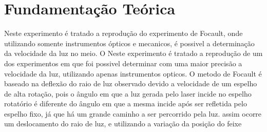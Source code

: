 \section{Fundamentação Teórica}
Neste experimento é tratado a reprodução do experimento de Focault, onde utilizando somente instrumentos ópticos e mecanicos, é possivel a determinação da velocidade da luz no meio.
O 
Neste experimento é tratado a reprodução de um dos experimentos em que foi possivel determinar com uma maior precisão a velocidade da luz, utilizando apenas instrumentos opticos. O metodo de Focault é baseado na deflexão do raio de luz observado devido a velocidade de um espelho de alta rotação, pois o ângulo em que a luz gerada pelo laser incide no espelho rotatório é diferente do ângulo em que a mesma incide após ser refletida pelo espelho fixo, já que há um grande caminho a ser percorrido pela luz. assim ocorre um deslocamento do raio de luz, e utilizando a variação da posição do feixe 
